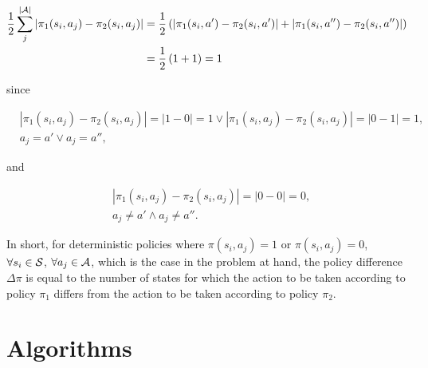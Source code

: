 \documentclass[a4paper]{article}
\begin{document}
\begin{align*}
\label{eq:policy_difference_explained1}
\frac{1}{2} \sum\limits_{j}^{|{\cal A}|} {\left| \pi_{1} (s_i, a_j) - \pi_{2} (s_i, a_j) \right|} &= \frac{1}{2} \left( \left| \pi_{1} (s_i, a') - \pi_{2} (s_i, a') \right| + \left| \pi_{1} (s_i, a'') - \pi_{2} (s_i, a'') \right| \right) \\ &= \frac{1}{2} \left(1 + 1\right) = 1
\end{align*}

since

\begin{align*}
& \left| \pi_{1} (s_i, a_j) - \pi_{2} (s_i, a_j) \right| = \left| 1 - 0 \right| = 1 \vee \left| \pi_{1} (s_i, a_j) - \pi_{2} (s_i, a_j) \right| = \left| 0 - 1 \right| = 1, \\
& a_j = a' \vee a_j = a'',
\end{align*}

and

\begin{align*}
& \left| \pi_{1} (s_i, a_j) - \pi_{2} (s_i, a_j) \right| = \left| 0 - 0 \right| = 0, \\
& a_j \ne a' \wedge a_j \ne a''. 
\end{align*}

In short, for deterministic policies where $\pi (s_i,a_j) = 1$ or $\pi (s_i,a_j) = 0$, $\forall s_i \in {\cal S}$, $\forall a_j \in {\cal A}$, which is the case in the problem at hand, the policy difference $\Delta \pi$ is equal to the number of states for which the action to be taken according to policy $\pi_{1}$ differs from the action to be taken according to policy $\pi_{2}$.


\vfill
\newpage
\section{Algorithms}
\end{document}
